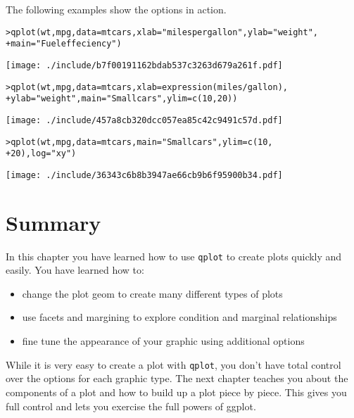 The following examples show the options in action.

\begin{alltt}
> qplot(wt, mpg, data = mtcars, xlab = "miles per gallon", ylab = "weight", 
+     main = "Fuel effeciency")
\end{alltt}
\texttt{[image: ./include/b7f00191162bdab537c3263d679a261f.pdf]}
\begin{alltt}

> qplot(wt, mpg, data = mtcars, xlab = expression(miles/gallon), 
+     ylab = "weight", main = "Small cars", ylim = c(10, 20))
\end{alltt}
\texttt{[image: ./include/457a8cb320dcc057ea85c42c9491c57d.pdf]}
\begin{alltt}

> qplot(wt, mpg, data = mtcars, main = "Small cars", ylim = c(10, 
+     20), log = "xy")
\end{alltt}
\texttt{[image: ./include/36343c6b8b3947ae66cb9b6f95900b34.pdf]}
\begin{alltt}

\end{alltt}

\section{Summary}

In this chapter you have learned how to use {\tt qplot} to create plots quickly and easily. You have learned how to:

\begin{itemize}
	\item change the plot geom to create many different types of plots
	\item use facets and margining to explore condition and marginal relationships
	\item fine tune the appearance of your graphic using additional options
\end{itemize}

While it is very easy to create a plot with {\tt qplot}, you don't have total control over the options for each graphic type.  The next chapter teaches you about the components of a plot and how to build up a plot piece by piece.  This gives you full control and lets you exercise the full powers of ggplot.  


